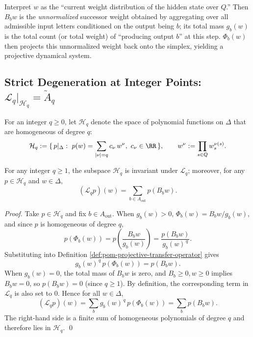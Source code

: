 \begin{remark}
Interpret \(w\) as the ``current weight distribution of the hidden state over \(Q\).'' Then \(B_b w\) is the \emph{unnormalized} successor weight obtained by aggregating over all admissible input letters conditioned on the output being \(b\); its total mass \(g_b(w)\) is the total count (or total weight) of ``producing output \(b\)'' at this step. \(\Phi_b(w)\) then projects this unnormalized weight back onto the simplex, yielding a projective dynamical system.
\end{remark}

\subsection{Strict Degeneration at Integer Points: \texorpdfstring{$\mathcal{L}_q|_{\mathcal{H}_q}=\widetilde A_q$}{Lq|Hq=Aq}}
\begin{definition}\label{def:pom-homogeneous-polynomials-simplex}
For an integer \(q\ge 0\), let \(\mathcal{H}_q\) denote the space of polynomial functions on \(\Delta\) that are homogeneous of degree \(q\):
\[
\mathcal{H}_q:=\{\,p|_{\Delta}:\ p(w)=\sum_{|\nu|=q}c_\nu\,w^\nu,\ c_\nu\in\RR\,\},
\qquad
w^\nu:=\prod_{s\in Q} w_s^{\nu(s)}.
\]
\end{definition}

\begin{proposition}\label{prop:pom-projective-operator-invariant-homogeneous}
For any integer \(q\ge 1\), the subspace \(\mathcal{H}_q\) is invariant under \(\mathcal{L}_q\); moreover, for any \(p\in\mathcal{H}_q\) and \(w\in\Delta\),
\[
(\mathcal{L}_q p)(w)=\sum_{b\in A_{\mathrm{out}}} p(B_b w).
\]
\end{proposition}
\begin{proof}
Take \(p\in\mathcal{H}_q\) and fix \(b\in A_{\mathrm{out}}\).
When \(g_b(w)>0\), \(\Phi_b(w)=B_b w/g_b(w)\), and since \(p\) is homogeneous of degree \(q\),
\[
p(\Phi_b(w))=p\!\left(\frac{B_b w}{g_b(w)}\right)=\frac{p(B_b w)}{g_b(w)^{\,q}}.
\]
Substituting into Definition \ref{def:pom-projective-transfer-operator} gives
\[
g_b(w)^{\,q}\,p(\Phi_b(w))=p(B_b w).
\]
When \(g_b(w)=0\), the total mass of \(B_b w\) is zero, and \(B_b\ge 0,w\ge 0\) implies \(B_b w=0\), so \(p(B_b w)=0\) (since \(q\ge 1\)). By definition, the corresponding term in \(\mathcal{L}_q\) is also set to \(0\). Hence for all \(w\in\Delta\),
\[
(\mathcal{L}_q p)(w)=\sum_{b} g_b(w)^{\,q}\,p(\Phi_b(w))=\sum_b p(B_b w).
\]
The right-hand side is a finite sum of homogeneous polynomials of degree \(q\) and therefore lies in \(\mathcal{H}_q\). \qed
\end{proof}


